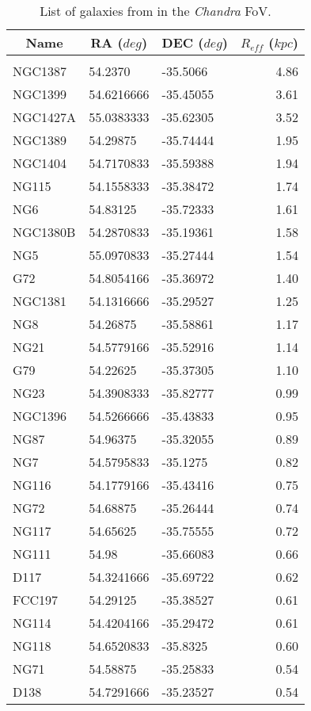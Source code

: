 \documentclass{aa}
\begin{document}
\begin{table}
\small
\caption{ List of galaxies from \cite{Ferguson1998} in the \textit{Chandra} FoV.}  
\label{table:2}

\begin{tabular}{l l l r}
\hline\hline
  \multicolumn{1}{c}{Name} &
  \multicolumn{1}{c}{RA ($deg$)} &
  \multicolumn{1}{c}{DEC ($deg$)} &
  \multicolumn{1}{c}{$R_{eff}$ ($kpc$)} \\ [0.5ex] 
\hline\\

  NGC1387 & 54.2370 & -35.5066 & 4.86\\
  NGC1399 & 54.6216666 & -35.45055 & 3.61\\
  NGC1427A & 55.0383333 & -35.62305 & 3.52\\
  NGC1389 & 54.29875 & -35.74444 & 1.95\\
  NGC1404 & 54.7170833 & -35.59388 & 1.94\\
  NG115 & 54.1558333 & -35.38472 & 1.74\\
  NG6 & 54.83125 & -35.72333 & 1.61\\
  NGC1380B & 54.2870833 & -35.19361 & 1.58\\
  NG5 & 55.0970833 & -35.27444 & 1.54\\
  G72& 54.8054166 & -35.36972 & 1.40\\
  NGC1381 & 54.1316666 & -35.29527 & 1.25\\
  NG8 & 54.26875 & -35.58861 & 1.17\\
  NG21& 54.5779166 & -35.52916 & 1.14\\
  G79& 54.22625 & -35.37305 & 1.10\\
  NG23 & 54.3908333 & -35.82777 & 0.99\\
  NGC1396 & 54.5266666 & -35.43833 & 0.95\\
  NG87 & 54.96375 & -35.32055 & 0.89\\
  NG7 & 54.5795833 & -35.1275 & 0.82\\
  NG116 & 54.1779166 & -35.43416 & 0.75\\
  NG72 & 54.68875 & -35.26444 &  0.74\\
  NG117 & 54.65625 & -35.75555 & 0.72\\
  NG111 & 54.98 & -35.66083 & 0.66\\
  D117 & 54.3241666 & -35.69722 & 0.62\\
  FCC197 & 54.29125 & -35.38527 & 0.61\\
  NG114 & 54.4204166 & -35.29472 & 0.61\\
  NG118 & 54.6520833 & -35.8325 & 0.60\\
  NG71 & 54.58875 & -35.25833 & 0.54\\
  D138 & 54.7291666 & -35.23527 & 0.54\\
\hline
\end{tabular}
\end{table}
\end{document}
